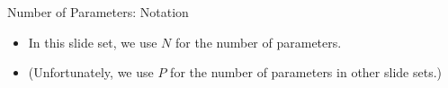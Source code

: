 \documentclass[11pt,compress,t,notes=noshow, xcolor=table]{beamer}
\begin{document}






\begin{vbframe}{Number of Parameters: Notation}

\vfill

\begin{itemize}
\item In this slide set, we use $N$ for the number of parameters.
\item (Unfortunately,  we use $P$ for the number of
  parameters in other slide sets.)
\end{itemize}

\vfill
    
\end{vbframe}

\end{document}
